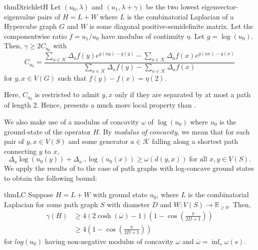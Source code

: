 \begin{restatable}{thm}{DirichletH}\label{thm:Dirichlet_Hypercube}
	Let $(u_0, \lambda)$ and $(u_1, \lambda+\gamma)$ be the two lowest eigenvector-eigenvalue pairs of $H=L+W$ where $L$ is the combinatorial Laplacian of a Hypercube graph $G$ and $W$ is some diagonal positive-semidefinite matrix. Let the componentwise ratio $f=u_1/u_0$ have modulus of continuity $\eta$. Let $g = \log(u_0)$. Then, $\gamma \geq 2 C_{u_0}$ with 
	\begin{equation*}
		C_{u_0} = \frac{\displaystyle \sum_{a\in\mathcal{K}}\Delta_a f(y)e^{g(ay)-g(y)} -\sum_{a\in\mathcal{K}}\Delta_a f(x)e^{g(ax)-g(x)}}{\displaystyle\sum_{a\in\mathcal{K}}\Delta_a f(y)-\sum_{a\in\mathcal{K}}\Delta_a f(x)}
	\end{equation*}
	for $y,x \in V(G)$ such that $f(y)-f(x) = \eta(2)$.
\end{restatable}
Here, $C_{u_0}$ is restricted to admit $y,x$ only if they are separated by at most a path of length 2. Hence,  presents a much more local property than .

We also make use of a modulus of concavity $\omega$ of $\log(u_0)$ where $u_0$ is the ground-state of the operator $H$. By \textit{modulus of concavity}, we mean that for each pair of $y,x \in V(S)$ and some generator $a \in \mathcal{K}$ falling along a shortest path connecting $y$ to $x$, 
\begin{equation*}
	\Delta_a \log(u_0(y)) + \Delta_{a^{-1}}\log(u_0(x)) \geq \omega(d(y,x)) \; \text{for all $x,y\in V(S)$}.
\end{equation*}
 We apply the results of  to the case of path graphs with log-concave ground states to obtain the following bound:

\begin{restatable}{thm}{LC}\label{thm:LCbound}
	Suppose $H = L + W$ with ground state $u_0$, where $L$ is the combinatorial Laplacian for some path graph $S$ with diameter $D$ and $W:V(S)\longrightarrow \mathbb{R}_{\geq 0}$. Then,
	\begin{align*}
		\gamma(H) & \geq 4\left(2\cosh(\overline{\omega})-1\right)\left(1- \cos\left(\frac{\pi}{2D +1}\right)\right) \\
		& \geq 4 \left(1- \cos\left(\frac{\pi}{2D +1}\right)\right)
	\end{align*}	
	for $log(u_0)$ having non-negative modulus of concavity $\omega$ and $\overline{\omega}=\inf_s \omega(s)$.
\end{restatable}

